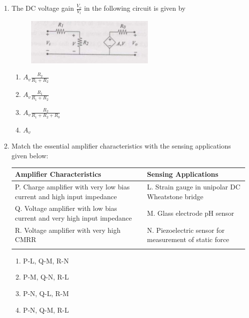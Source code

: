 \documentclass[journal]{IEEEtran}
\begin{document}
\begin{enumerate}
 \item The DC voltage gain $\frac{V_o}{V_i}$ in the following circuit is given by  
\begin{figure}[h!]
    \centering \includegraphics[width=0.6\textwidth]{1.jpg} 
    \caption{}
    \label{fig:fig1} 
\end{figure}
\begin{multicols}{2}
\begin{enumerate}
\item $A_v \frac{R_2}{R_1 + R_2}$
\item $A_v \frac{R_1}{R_1 + R_2}$
\item $A_v \frac{R_2}{R_1 + R_2 + R_0}$
\item $A_v$
\end{enumerate}
\end{multicols}

\item Match the essential amplifier characteristics with the sensing applications given below: \\
\begin{tabular}{p{4cm} p{4cm}}
\textbf{Amplifier Characteristics} & \textbf{Sensing Applications} \\
\hline
P. Charge amplifier with very low bias current and high input impedance & L. Strain gauge in unipolar DC Wheatstone bridge \\
Q. Voltage amplifier with low bias current and very high input impedance & M. Glass electrode pH sensor \\
R. Voltage amplifier with very high CMRR & N. Piezoelectric sensor for measurement of static force \\
\caption{}
\label{tab:matching}
\end{tabular}
\begin{multicols}{2}
\begin{enumerate}
\item P-L, Q-M, R-N
\item P-M, Q-N, R-L
\item P-N, Q-L, R-M
\item P-N, Q-M, R-L
\end{enumerate}
\end{multicols}


\end{enumerate}
\end{document}
